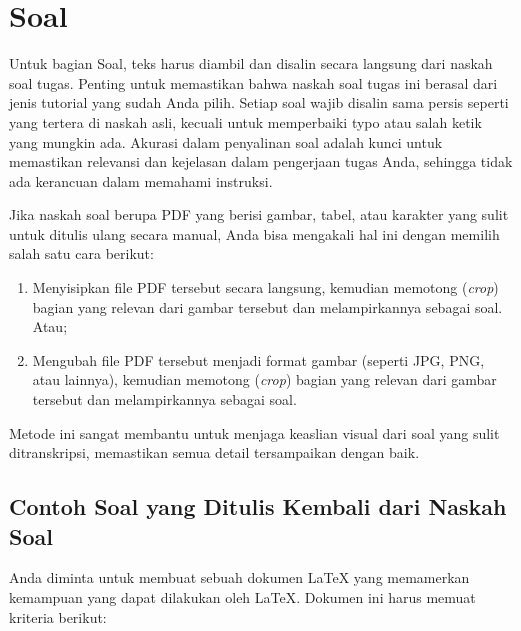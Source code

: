 \chapter{Soal}


Untuk bagian Soal, teks harus diambil dan disalin secara langsung dari naskah soal tugas. Penting untuk memastikan bahwa naskah soal tugas ini berasal dari jenis tutorial yang sudah Anda pilih. Setiap soal wajib disalin sama persis seperti yang tertera di naskah asli, kecuali untuk memperbaiki typo atau salah ketik yang mungkin ada. Akurasi dalam penyalinan soal adalah kunci untuk memastikan relevansi dan kejelasan dalam pengerjaan tugas Anda, sehingga tidak ada kerancuan dalam memahami instruksi.

Jika naskah soal berupa PDF yang berisi gambar, tabel, atau karakter yang sulit untuk ditulis ulang secara manual, Anda bisa mengakali hal ini dengan memilih salah satu cara berikut: 

\begin{enumerate}
    \item Menyisipkan file PDF tersebut secara langsung, kemudian memotong (\textit{crop}) bagian yang relevan dari gambar tersebut dan melampirkannya sebagai soal. Atau;
    \item Mengubah file PDF tersebut menjadi format gambar (seperti JPG, PNG, atau lainnya), kemudian memotong (\textit{crop}) bagian yang relevan dari gambar tersebut dan melampirkannya sebagai soal.
\end{enumerate}

Metode ini sangat membantu untuk menjaga keaslian visual dari soal yang sulit ditranskripsi, memastikan semua detail tersampaikan dengan baik.

\section{Contoh Soal yang Ditulis Kembali dari Naskah Soal}

Anda diminta untuk membuat sebuah dokumen LaTeX yang memamerkan kemampuan yang dapat dilakukan oleh LaTeX. Dokumen ini harus memuat kriteria berikut:

